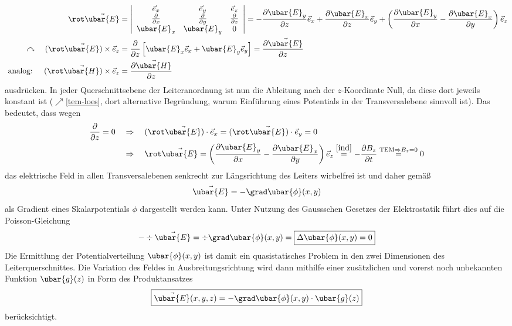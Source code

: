 \begin{equation}
\begin{split}
	\rot \vec{\ubar{E}} & =\left|\begin{array}{ccc}
		\vec{e}_{x} & \vec{e}_{y} & \vec{e}_{z} \\
		\frac{\partial}{\partial x} & \frac{\partial}{\partial y} & \frac{\partial}{\partial z} \\
		\ubar{E}_{x} & \ubar{E}_{y} & 0
	\end{array}\right|=-\frac{\partial \ubar{E}_{y}}{\partial z} \vec{e}_{x}+\frac{\partial \ubar{E}_{x}}{\partial z} \vec{e}_{y}+\left(\frac{\partial \ubar{E}_{y}}{\partial x}-\frac{\partial \ubar{E}_{x}}{\partial y}\right) \vec{e}_{z}  \\
	\curvearrowright \quad(\rot \vec{\ubar{E}}) \times \vec{e}_{z} & =\frac{\partial}{\partial z}\left[\ubar{E}_{x} \vec{e}_{x}+\ubar{E}_{y} \vec{e}_{y}\right]=\frac{\partial \vec{\ubar{E}}}{\partial z}  \\
	\text { analog: } \quad(\rot \vec{\ubar{H}}) \times \vec{e}_{z} & =\frac{\partial \vec{\ubar{H}}}{\partial z}
\end{split}
\end{equation}
ausdrücken. In jeder Querschnittsebene der Leiteranordnung ist nun die Ableitung nach der $z$-Koordinate Null, da diese dort jeweils konstant ist ($\nearrow$\ref{tem-loes}, dort  alternative Begründung, warum Einführung eines Potentials in der Transversalebene sinnvoll ist). Das bedeutet, dass wegen
\begin{equation}\begin{split}
	\frac{\partial}{\partial z}=0\quad &\Rightarrow \quad (\rot \vec{\ubar{E}})\cdot \vec{e}_{x}=(\rot \vec{\ubar{E}})\cdot \vec{e}_{y}=0 \\ 
	&\Rightarrow \quad  \rot \vec{\ubar{E}}=\left(\frac{\partial \ubar{E}_{y}}{\partial x}-\frac{\partial \ubar{E}_{x}}{\partial y}\right) \vec{e}_{z}\stackrel{\ref{ind}}{=}-\frac{\partial B_z}{\partial t}\stackrel{\text{TEM}\Rightarrow B_z=0}{=}0
\end{split}\end{equation}
das elektrische Feld in allen Transversalebenen senkrecht zur Längsrichtung des Leiters wirbelfrei ist und daher gemäß
\begin{equation}\label{e-gradphi}
	\vec{\ubar{E}}=-\grad \ubar{\phi}(x, y)
\end{equation}
als Gradient eines Skalarpotentials $\phi$ dargestellt werden kann. Unter Nutzung des Gaussschen Gesetzes der Elektrostatik führt dies auf die Poisson-Gleichung
\begin{equation}
	-\div \vec{\ubar{E}}=\div \grad \ubar{\phi}(x, y)=\boxed{\Delta \ubar{\phi}(x, y)=0} 
\end{equation}
Die Ermittlung der Potentialverteilung $\ubar{\phi}(x, y)$ ist damit ein quasistatisches Problem in den zwei Dimensionen des Leiterquerschnittes. Die Variation des Feldes in Ausbreitungsrichtung wird dann mithilfe einer zusätzlichen und vorerst noch unbekannten Funktion $\ubar{g}(z)$ in Form des Produktansatzes
\begin{equation}
\boxed{	\vec{\ubar{E}}(x, y, z)=-\grad \ubar{\phi}(x, y) \cdot \ubar{g}(z) }
\end{equation}
berücksichtigt. 
